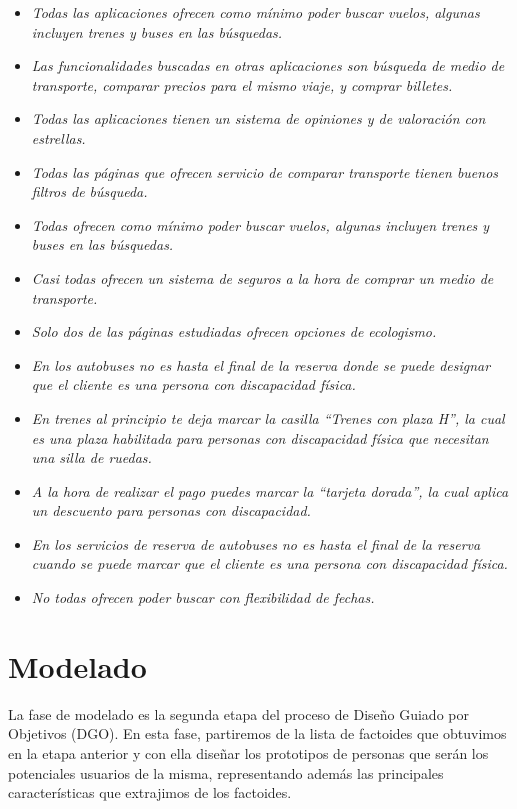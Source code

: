 \begin{itemize}
    \item \textit{Todas las aplicaciones ofrecen como mínimo poder buscar vuelos, algunas incluyen trenes y buses en las búsquedas.}
    \item \textit{Las funcionalidades buscadas en otras aplicaciones son búsqueda de medio de transporte, comparar precios para el mismo viaje, y comprar billetes.}
    \item \textit{Todas las aplicaciones tienen un sistema de opiniones y de valoración con estrellas.}
    \item \textit{Todas las páginas que ofrecen servicio de comparar transporte tienen buenos filtros de búsqueda.}
    \item \textit{Todas ofrecen como mínimo poder buscar vuelos, algunas incluyen trenes y buses en las búsquedas.}
    \item \textit{Casi todas ofrecen un sistema de seguros a la hora de comprar un medio de transporte.}
    \item \textit{Solo dos de las páginas estudiadas ofrecen opciones de ecologismo.}
    \item \textit{En los autobuses no es hasta el final de la reserva donde se puede designar que el cliente es una persona con discapacidad física.}
    \item \textit{En trenes al principio te deja marcar la casilla “Trenes con plaza H”, la cual es una plaza habilitada para personas con discapacidad física que necesitan una silla de ruedas.}
    \item \textit{A la hora de realizar el pago puedes marcar la “tarjeta dorada”, la cual aplica un descuento para personas con discapacidad.}
    \item \textit{En los servicios de reserva de autobuses no es hasta el final de la reserva cuando se puede marcar que el cliente es una persona con discapacidad física.}
    \item \textit{No todas ofrecen poder buscar con flexibilidad de fechas.}
\end{itemize}

\section{Modelado}
La fase de modelado es la segunda etapa del proceso de Diseño Guiado por Objetivos (DGO). En esta fase, partiremos de la lista de factoides que
obtuvimos en la etapa anterior y con ella diseñar los prototipos de personas que serán los potenciales usuarios de la misma, representando además
las principales características que extrajimos de los factoides.

